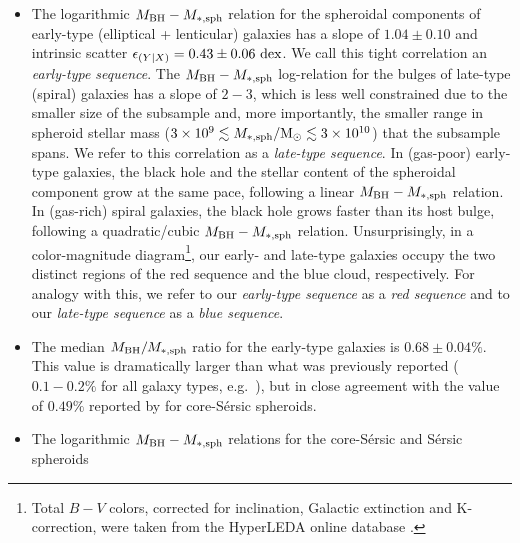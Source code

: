 \documentclass[preprint2]{emulateapj}
\begin{document}
\begin{itemize}
\item The logarithmic $M_{\rm BH} - M_{\rm *,sph}$ relation for the spheroidal components of early-type (elliptical + lenticular) galaxies 
      has a slope of $1.04 \pm 0.10$ and intrinsic scatter $\epsilon_{(Y|X)} = 0.43 \pm 0.06\rm~dex$. 
      We call this tight correlation an \emph{early-type sequence}. 
      The $M_{\rm BH} - M_{\rm *,sph}$ log-relation for the bulges of late-type (spiral) galaxies has a slope of $2-3$,
      which is less well constrained due to
      the smaller size of the subsample and, more importantly, the smaller range in spheroid stellar mass 
      ($3 \times 10^9 \lesssim M_{\rm *,sph}/{\rm M_\odot} \lesssim 3 \times 10^{10}$) that the subsample spans. 
      We refer to this correlation as a \emph{late-type sequence}. 
      In (gas-poor) early-type galaxies, the black hole and the stellar content of the spheroidal component grow at the same pace, 
      following a linear $M_{\rm BH} - M_{\rm *,sph}$ relation. 
      In (gas-rich) spiral galaxies, the black hole grows faster than its host bulge, 
      following a quadratic/cubic $M_{\rm BH} - M_{\rm *,sph}$ relation. 
      Unsurprisingly, in a color-magnitude diagram\footnote{Total $B-V$ colors, 
      corrected for inclination, Galactic extinction and K-correction, 
      were taken from the HyperLEDA online database \citep{hyperleda}.}, 
      our early- and late-type galaxies occupy the two distinct regions of the red sequence and the blue cloud, respectively. 
      For analogy with this, we refer to our \emph{early-type sequence} as a \emph{red sequence} 
      and to our \emph{late-type sequence} as a \emph{blue sequence}. 
\item The median $M_{\rm BH}/M_{\rm *,sph}$ ratio for the early-type galaxies is $0.68 \pm 0.04\%$. 
      This value is dramatically larger than what was previously reported ($0.1 - 0.2\%$ for all galaxy types, e.g.~\citealt{marconihunt2003}), 
      but in close agreement with the value of $0.49\%$ reported by \cite{grahamscott2013} for core-S\'ersic spheroids. 
\item The logarithmic $M_{\rm BH} - M_{\rm *,sph}$ relations for the core-S\'ersic and S\'ersic spheroids 

\end{itemize}
\end{document}
